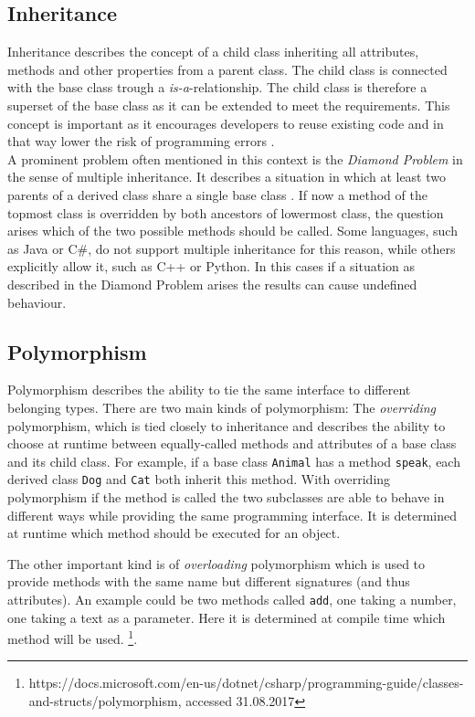 \subsection{Inheritance}
Inheritance describes the concept of a child class inheriting all attributes, methods and other properties from a parent class. The child class is connected with the base class trough a \emph{is-a}-relationship. The child class is therefore a superset of the base class as it can be extended to meet the requirements. This concept is important as it encourages developers to reuse existing code and in that way lower the risk of programming errors \cite{johnson91}. \\
A prominent problem often mentioned in this context is the \emph{Diamond Problem} in the sense of multiple inheritance. It describes a situation in which at least two parents of a derived class share a single base class \cite{Truyen04}. If now a method of the topmost class is overridden by both ancestors of lowermost class, the question arises which of the two possible methods should be called. Some languages, such as Java or C\#, do not support multiple inheritance for this reason, while others explicitly allow it, such as C++ or Python. In this cases if a situation as described in the Diamond Problem arises the results can cause undefined behaviour.

\subsection{Polymorphism}

Polymorphism describes the ability to tie the same interface to different belonging types. There are two main kinds of polymorphism: The \emph{overriding} polymorphism, which is tied closely to inheritance and describes the ability to choose at runtime between equally-called methods and attributes of a base class and its child class. For example, if a base class \texttt{Animal} has a method \texttt{speak}, each derived class \texttt{Dog} and \texttt{Cat} both inherit this method. With overriding polymorphism if the method is called the two subclasses are able to behave in different ways while providing the same programming interface. It is determined at runtime which method should be executed for an object. 

The other important kind is of \emph{overloading} polymorphism which is used to provide methods with the same name but different signatures (and thus attributes). An example could be two methods called \texttt{add}, one taking a number, one taking a text as a parameter. Here it is determined at compile time which method will be used. \footnote{https://docs.microsoft.com/en-us/dotnet/csharp/programming-guide/classes-and-structs/polymorphism, accessed 31.08.2017}.

